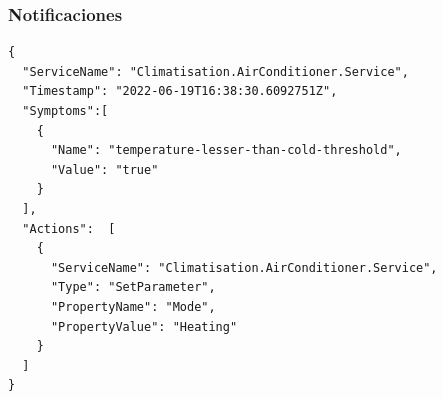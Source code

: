\subsubsection{Notificaciones}

\newsavebox\executenotificationbox
\begin{lrbox}{\executenotificationbox}
  \begin{minipage}[t]{2in}
    \begin{verbatim}
{
  "ServiceName": "Climatisation.AirConditioner.Service",
  "Timestamp": "2022-06-19T16:38:30.6092751Z",
  "Symptoms":[
    {
      "Name": "temperature-lesser-than-cold-threshold",
      "Value": "true"
    }
  ],
  "Actions":  [
    {
      "ServiceName": "Climatisation.AirConditioner.Service",
      "Type": "SetParameter",
      "PropertyName": "Mode",
      "PropertyValue": "Heating"
    }
  ]
}
        \end{verbatim}
  \end{minipage}
\end{lrbox}

